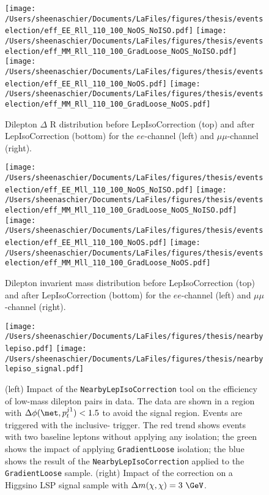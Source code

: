   \begin{figure}[tbp]
     \texttt{[image: /Users/sheenaschier/Documents/LaFiles/figures/thesis/eventselection/eff\_EE\_Rll\_110\_100\_NoOS\_NoISO.pdf]}
       \texttt{[image: /Users/sheenaschier/Documents/LaFiles/figures/thesis/eventselection/eff\_MM\_Rll\_110\_100\_GradLoose\_NoOS\_NoISO.pdf]}\\
     \texttt{[image: /Users/sheenaschier/Documents/LaFiles/figures/thesis/eventselection/eff\_EE\_Rll\_110\_100\_NoOS.pdf]}
     \texttt{[image: /Users/sheenaschier/Documents/LaFiles/figures/thesis/eventselection/eff\_MM\_Rll\_110\_100\_GradLoose\_NoOS.pdf]}\\
   \caption{Dilepton $\Delta$ R distribution before LepIsoCorrection (top) and after LepIsoCorrection (bottom) for the $ee$-channel (left) and $\mu\mu$-channel (right).}
   \label{fig:EffRll_ISOCorr}
 \end{figure}

  \begin{figure}[tbp]
     \texttt{[image: /Users/sheenaschier/Documents/LaFiles/figures/thesis/eventselection/eff\_EE\_Mll\_110\_100\_NoOS\_NoISO.pdf]}
       \texttt{[image: /Users/sheenaschier/Documents/LaFiles/figures/thesis/eventselection/eff\_MM\_Mll\_110\_100\_GradLoose\_NoOS\_NoISO.pdf]}\\
     \texttt{[image: /Users/sheenaschier/Documents/LaFiles/figures/thesis/eventselection/eff\_EE\_Mll\_110\_100\_NoOS.pdf]}
     \texttt{[image: /Users/sheenaschier/Documents/LaFiles/figures/thesis/eventselection/eff\_MM\_Mll\_110\_100\_GradLoose\_NoOS.pdf]}\\
   \caption{Dilepton invarient mass distribution before LepIsoCorrection (top) and after LepIsoCorrection (bottom) for the $ee$-channel (left) and $\mu\mu$-channel (right).}
   \label{fig:EffMll_ISOCorr}
 \end{figure}

 \begin{figure}[tbp]
  \texttt{[image: /Users/sheenaschier/Documents/LaFiles/figures/thesis/nearbylepiso.pdf]}
   \texttt{[image: /Users/sheenaschier/Documents/LaFiles/figures/thesis/nearbylepiso\_signal.pdf]}
  \caption{(left) Impact of the \texttt{NearbyLepIsoCorrection} tool on the efficiency of low-mass dilepton pairs in data.  The data are shown in a region with $\Delta\phi(\met, p_{t}^{j1})<1.5$ to avoid the signal region.  Events are triggered with the inclusive-\met{} trigger.  The red trend shows events with two baseline leptons without applying any isolation; the green shows the impact of applying \texttt{GradientLoose} isolation; the blue shows the result of the \texttt{NearbyLepIsoCorrection} applied to the \texttt{GradientLoose} sample.  (right) Impact of the correction on a Higgsino LSP signal sample with $\Delta m(\chi,\chi)=3~\GeV$.}
 \label{fig:nearbylepiso}
 \end{figure}
 
